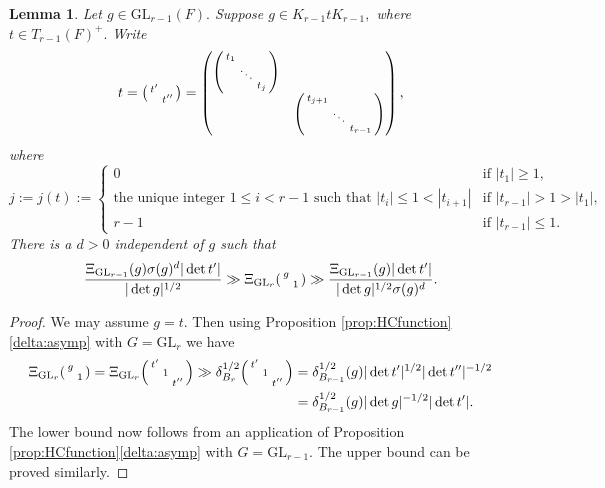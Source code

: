 \documentclass[12pt]{amsart}
\newtheorem{lem}[thm]{Lemma}
\theoremstyle{remark}
\numberwithin{equation}{section}
\newcommand{\GL}{\mathrm{GL}}
\theoremstyle{definition}
\newenvironment{psmatrix}
  {\left(\begin{smallmatrix}}
  {\end{smallmatrix}\right)}
\numberwithin{equation}{subsection}
\begin{document}
\begin{lem} \label{lem:Levi}
Let $g\in \GL_{r-1}(F).$ Suppose $g\in K_{r-1}tK_{r-1},$ where $t\in T_{r-1}(F)^+.$ Write 
\begin{align*}
    t=\begin{psmatrix}
        t'\\
         & t''
    \end{psmatrix}=\left(\begin{matrix}\begin{psmatrix}
        t_1 & & \\&\ddots & \\ & & t_{j}
    \end{psmatrix}& \\
    & \begin{psmatrix}
        t_{j+1} & & \\&\ddots & \\ & & t_{r-1}
    \end{psmatrix}\end{matrix}\right),
\end{align*}
where
$$
j:=j(t):=\begin{cases} 0 &\textrm{if } |t_1| \geq 1,\\
\textrm{the unique integer $1 \leq i < r-1$ such that }|t_i|\leq  1 <|t_{i+1}| &\textrm{if }|t_{r-1}|>1>|t_1|,\\
r-1 &\textrm{if }|t_{r-1}|\leq 1.
\end{cases}
$$ 
There is a $d>0$ independent of $g$ such that
$$
\frac{\Xi_{\GL_{r-1}}(g)\sigma(g)^{d}|\det t'|}{|\det g|^{1/2}}\gg \Xi_{\GL_{r}}\begin{psmatrix} g & \\ & 1 \end{psmatrix} \gg \frac{\Xi_{\GL_{r-1}}(g)|\det t'|}{|\det g|^{1/2}\sigma(g)^{d}}.
$$
\end{lem}

\begin{proof} 
We may assume $g=t.$  Then using Proposition \ref{prop:HCfunction}\ref{delta:asymp} with $G=\GL_r$ we have
\begin{align*}
     \Xi_{\GL_r}\begin{psmatrix} g & \\ & 1 \end{psmatrix} = \Xi_{\GL_r}\begin{psmatrix} t' & &\\  & 1&\\& & t'' \end{psmatrix}\gg \delta_{B_r}^{1/2}\begin{psmatrix} t' & &\\  & 1&\\& & t'' \end{psmatrix}&=\delta^{1/2}_{B_{r-1}}(g)|\det t'|^{1/2}|\det t''|^{-1/2}\\&=\delta^{1/2}_{B_{r-1}}(g)|\det g|^{-1/2}|\det t'|.
\end{align*}
The lower bound now follows from an application of Proposition \ref{prop:HCfunction}\ref{delta:asymp} with $G=\GL_{r-1}.$ The upper bound can be proved similarly.\end{proof}
\end{document}
